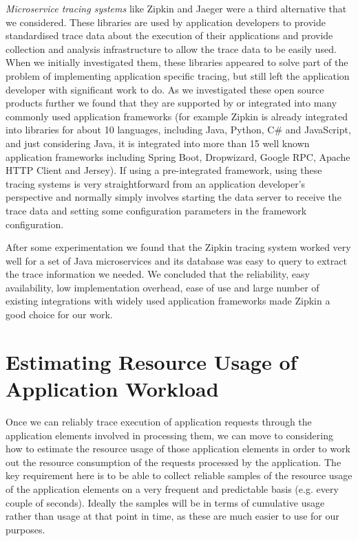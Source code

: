 \emph{Microservice tracing systems} like Zipkin and Jaeger \cite{zipkin2018, jaeger2018} were a third alternative that we considered.  These libraries are used by application developers to provide standardised trace data about the execution of their applications and provide collection and analysis infrastructure to allow the trace data to be easily used.  When we initially investigated them, these libraries appeared to solve part of the problem of implementing application specific tracing, but still left the application developer with significant work to do.  As we investigated these open source products further we found that they are supported by or integrated into many commonly used application frameworks (for example Zipkin is already integrated into libraries for about 10 languages, including Java, Python, C\# and JavaScript, and just considering Java, it is integrated into more than 15 well known application frameworks including Spring Boot, Dropwizard, Google RPC, Apache HTTP Client and Jersey).  If using a pre-integrated framework, using these tracing systems is very straightforward from an application developer's perspective and normally simply involves starting the data server to receive the trace data and setting some configuration parameters in the framework configuration.

After some experimentation we found that the Zipkin tracing system worked very well for a set of Java microservices and its database was easy to query to extract the trace information we needed.  We concluded that the reliability, easy availability, low implementation overhead, ease of use and large number of existing integrations with widely used application frameworks made Zipkin a good choice for our work.

\section{Estimating Resource Usage of Application Workload}

Once we can reliably trace execution of application requests through the application elements involved in processing them, we can move to considering how to estimate the resource usage of those application elements in order to work out the resource consumption of the requests processed by the application.  The key requirement here is to be able to collect reliable samples of the resource usage of the application elements on a very frequent and predictable basis (e.g. every couple of seconds).  Ideally the samples will be in terms of cumulative usage rather than usage at that point in time, as these are much easier to use for our purposes.

